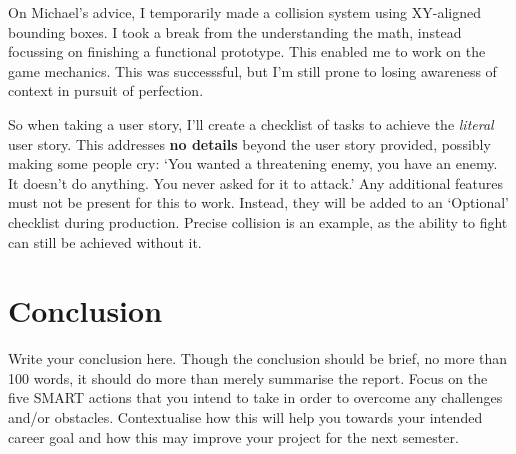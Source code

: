 \documentclass{scrartcl}
\begin{document}
On Michael's advice, I temporarily made a collision system using XY-aligned bounding boxes. I took a break from the understanding the math, instead focussing on finishing a functional prototype. This enabled me to work on the game mechanics. This was successsful, but I'm still prone to losing awareness of context in pursuit of perfection.

So when taking a user story, I'll create a checklist of tasks to achieve the \textit{literal} user story. This addresses \textbf{no details} beyond the user story provided, possibly making some people cry: `You wanted a threatening enemy, you have an enemy. It doesn't do anything. You never asked for it to attack.' Any additional features must not be present for this to work. Instead, they will be added to an `Optional' checklist during production. Precise collision is an example, as the ability to fight can still be achieved without it.

\section{Conclusion}

Write your conclusion here. Though the conclusion should be brief, no more than 100 words, it should do more than merely summarise the report. Focus on the five SMART actions that you intend to take in order to overcome any challenges and/or obstacles. Contextualise how this will help you towards your intended career goal and how this may improve your project for the next semester.



\end{document}
